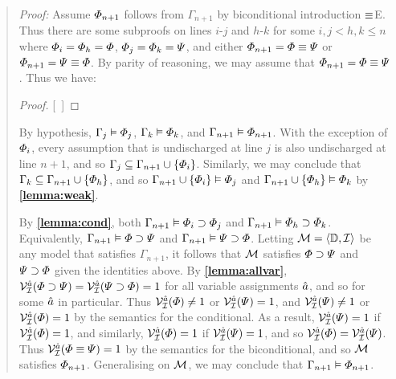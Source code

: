 \label{rule:BiconI}

\begin{quote} 
  \textit{Proof:} Assume $\varPhi_{n+1}$ follows from $\Gamma_{n+1}$ by biconditional introduction $\equiv$E.
  Thus there are some subproofs on lines $i$-$j$ and $h$-$k$ for some $i,j<h,k\leq n$ where $\varPhi_i=\varPhi_h=\varPhi$, $\varPhi_j=\varPhi_k=\varPsi$, and either $\varPhi_{n+1}=\varPhi\equiv\varPsi$ or $\varPhi_{n+1}=\varPsi\equiv\varPhi$.
  By parity of reasoning, we may assume that $\varPhi_{n+1}=\varPhi\equiv\varPsi$.
  Thus we have:

  \begin{proof}
    \open
       
    \close
    \open
       
    \close
    [\ ]{\metaA \eiff \metaB} 
  \end{proof}

  By hypothesis, $\Gamma_j\vDash \varPhi_j$, $\Gamma_k\vDash \varPhi_k$, and $\Gamma_{n+1}\vDash \varPhi_{n+1}$.
  With the exception of $\varPhi_i$, every assumption that is undischarged at line $j$ is also undischarged at line $n+1$, and so $\Gamma_j\subseteq\Gamma_{n+1}\cup\lbrace\varPhi_i\rbrace$.
  Similarly, we may conclude that $\Gamma_k\subseteq\Gamma_{n+1}\cup\lbrace\varPhi_h\rbrace$, and so $\Gamma_{n+1}\cup\lbrace\varPhi_i\rbrace \vDash \varPhi_j$ and $\Gamma_{n+1}\cup\lbrace\varPhi_h\rbrace \vDash \varPhi_k$ by \textbf{\ref{lemma:weak}}.

  By \textbf{\ref{lemma:cond}}, both $\Gamma_{n+1} \vDash \varPhi_i \supset \varPhi_j$ and $\Gamma_{n+1} \vDash \varPhi_h \supset \varPhi_k$.
  Equivalently, $\Gamma_{n+1} \vDash \varPhi \supset \varPsi$ and $\Gamma_{n+1} \vDash \varPsi \supset \varPhi$.
  Letting $\mathcal{M}=\langle\mathbb{D},\mathcal{I}\rangle$ be any model that satisfies $\Gamma_{n+1}$, it follows that $\mathcal{M}$ satisfies $\varPhi \supset \varPsi$ and $\varPsi \supset \varPhi$ given the identities above.
  By \textbf{\ref{lemma:allvar}}, $\mathcal{V}_{\mathcal{I}}^{\hat{a}}(\varPhi \supset \varPsi)=\mathcal{V}_{\mathcal{I}}^{\hat{a}}(\varPsi \supset \varPhi)=1$ for all variable assignments $\hat{a}$, and so for some $\hat{a}$ in particular. 
  Thus $\mathcal{V}_{\mathcal{I}}^{\hat{a}}(\varPhi)\neq 1$ or $\mathcal{V}_{\mathcal{I}}^{\hat{a}}(\varPsi)=1$, and $\mathcal{V}_{\mathcal{I}}^{\hat{a}}(\varPsi)\neq 1$ or $\mathcal{V}_{\mathcal{I}}^{\hat{a}}(\varPhi)=1$ by the semantics for the conditional.
  As a result, $\mathcal{V}_{\mathcal{I}}^{\hat{a}}(\varPsi)=1$ if $\mathcal{V}_{\mathcal{I}}^{\hat{a}}(\varPhi)=1$, and similarly, $\mathcal{V}_{\mathcal{I}}^{\hat{a}}(\varPhi)=1$ if $\mathcal{V}_{\mathcal{I}}^{\hat{a}}(\varPsi)=1$, and so $\mathcal{V}_{\mathcal{I}}^{\hat{a}}(\varPhi)=\mathcal{V}_{\mathcal{I}}^{\hat{a}}(\varPsi)$.
  Thus $\mathcal{V}_{\mathcal{I}}^{\hat{a}}(\varPhi \equiv \varPsi)=1$ by the semantics for the biconditional, and so $\mathcal{M}$ satisfies $\varPhi_{n+1}$.
  Generalising on $\mathcal{M}$, we may conclude that $\Gamma_{n+1}\vDash\varPhi_{n+1}$.
\end{quote}






